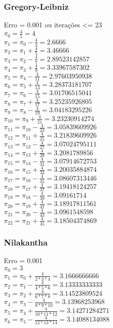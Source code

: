 \documentclass[11pt]{article}
\begin{document}
\subsubsection{Gregory-Leibniz}
Erro = 0.001 ou iterações <= 23\\
$\pi_0 = \frac{4}{1} = 4$\\
$\pi_1 = \pi_0 - \frac{4}{3} = 2.6666$\\
$\pi_2 = \pi_1 + \frac{4}{5} = 3.46666$\\
$\pi_3 = \pi_2 - \frac{4}{7} = 2.89523142857$\\
$\pi_4 = \pi_3 + \frac{4}{9} = 3.33967587302$\\
$\pi_5 = \pi_4 - \frac{4}{11} = 2.97603950938$\\
$\pi_6 = \pi_5 + \frac{4}{13} = 3.28373181707$\\
$\pi_7 = \pi_6 - \frac{4}{15} = 3.01706515041$\\
$\pi_8 = \pi_7 + \frac{4}{17} = 3.25235926805$\\
$\pi_9 = \pi_8 - \frac{4}{19} = 3.04183295226$\\
$\pi_{10} = \pi_9 + \frac{4}{21} = 3.23230914274$\\
$\pi_{11} = \pi_{10} - \frac{4}{23} = 3.05839609926$\\
$\pi_{12} = \pi_{11} + \frac{4}{25} = 3.21839609926$\\
$\pi_{13} = \pi_{12} - \frac{4}{27} = 3.07024795111$\\
$\pi_{14} = \pi_{13} + \frac{4}{29} = 3.2081789856$\\
$\pi_{15} = \pi_{14} - \frac{4}{31} = 3.07914672753$\\
$\pi_{16} = \pi_{15} + \frac{4}{33} = 3.20035884874$\\
$\pi_{17} = \pi_{16} - \frac{4}{35} = 3.08607313446$\\
$\pi_{18} = \pi_{17} + \frac{4}{37} = 3.19418124257$\\
$\pi_{19} = \pi_{18} - \frac{4}{39} = 3.09161714$\\
$\pi_{20} = \pi_{19} + \frac{4}{41} = 3.18917811561$\\
$\pi_{21} = \pi_{20} - \frac{4}{43} = 3.0961548598$\\
$\pi_{22} = \pi_{21} + \frac{4}{45} = 3.18504374869$\\

\subsubsection{Nilakantha}
Erro = 0.001\\
$\pi_0 = 3$\\
$\pi_1 = \pi_0 + \frac{4}{2*3*4} = 3.1666666666$\\
$\pi_2 = \pi_1 - \frac{4}{4*5*6} = 3.13333333333$\\
$\pi_3 = \pi_2 + \frac{4}{6*7*8} = 3.14523809524$\\
$\pi_4 = \pi_3 - \frac{4}{8*9*10} = 3.13968253968$\\
$\pi_5 = \pi_4 + \frac{4}{10*11*12} = 3.14271284271$\\
$\pi_6 = \pi_5 - \frac{4}{12*13*14} = 3.14088134088$\\
\end{document}
